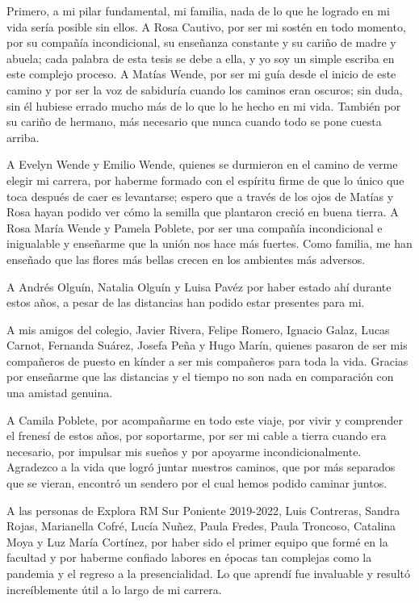 Primero, a mi pilar fundamental, mi familia, nada de lo que he logrado en mi vida sería posible sin ellos. A Rosa Cautivo, por ser mi sostén en todo momento, por su compañía incondicional, su enseñanza constante y su cariño de madre y abuela; cada palabra de esta tesis se debe a ella, y yo soy un simple escriba en este complejo proceso. A Matías Wende, por ser mi guía desde el inicio de este camino y por ser la voz de sabiduría cuando los caminos eran oscuros; sin duda, sin él hubiese errado mucho más de lo que lo he hecho en mi vida. También por su cariño de hermano, más necesario que nunca cuando todo se pone cuesta arriba.

A Evelyn Wende y Emilio Wende, quienes se durmieron en el camino de verme elegir mi carrera, por haberme formado con el espíritu firme de que lo único que toca después de caer es levantarse; espero que a través de los ojos de Matías y Rosa hayan podido ver cómo la semilla que plantaron creció en buena tierra. A Rosa María Wende y Pamela Poblete, por ser una compañía incondicional e inigualable y enseñarme que la unión nos hace más fuertes. Como familia, me han enseñado que las flores más bellas crecen en los ambientes más adversos.

A Andrés Olguín, Natalia Olguín y Luisa Pavéz por haber estado ahí durante estos años, a pesar de las distancias han podido estar presentes para mi. 

A mis amigos del colegio, Javier Rivera, Felipe Romero, Ignacio Galaz, Lucas Carnot, Fernanda Suárez, Josefa Peña y Hugo Marín, quienes pasaron de ser mis compañeros de puesto en kínder a ser mis compañeros para toda la vida. Gracias por enseñarme que las distancias y el tiempo no son nada en comparación con una amistad genuina.

A Camila Poblete, por acompañarme en todo este viaje, por vivir y comprender el frenesí de estos años, por soportarme, por ser mi cable a tierra cuando era necesario, por impulsar mis sueños y por apoyarme incondicionalmente. Agradezco a la vida que logró juntar nuestros caminos, que por más separados que se vieran, encontró un sendero por el cual hemos podido caminar juntos.

A las personas de Explora RM Sur Poniente 2019-2022, Luis Contreras, Sandra Rojas, Marianella Cofré, Lucía Nuñez, Paula Fredes, Paula Troncoso, Catalina Moya y Luz María Cortínez, por haber sido el primer equipo que formé en la facultad y por haberme confiado labores en épocas tan complejas como la pandemia y el regreso a la presencialidad. Lo que aprendí fue invaluable y resultó increíblemente útil a lo largo de mi carrera.

